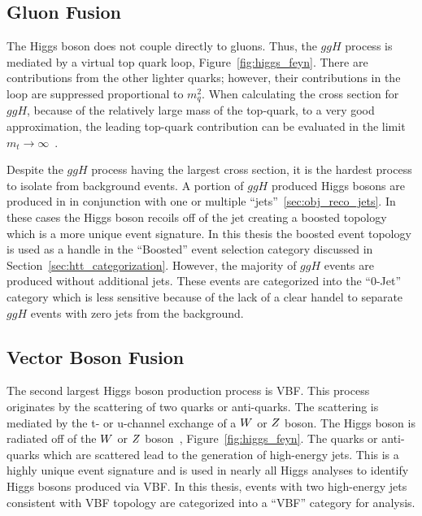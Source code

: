 \subsection{Gluon Fusion}
The Higgs boson does not couple directly to gluons. Thus, the $ggH$ process is mediated by 
a virtual top quark loop, Figure~\ref{fig:higgs_feyn}. There are contributions from the other lighter quarks; however,
their contributions in the loop are suppressed proportional to $m^{2}_{q}$.
When calculating the cross section for $ggH$, because of the relatively large mass of the top-quark, to a very good approximation, 
the leading top-quark contribution can be evaluated in the limit 
$m_{t} \to \infty$~\cite{ELLIS1976292,Shifman:1979eb}.

Despite the $ggH$ process having the largest cross section, it is the hardest process to 
isolate from background events. A portion of $ggH$ produced Higgs bosons are produced in
in conjunction with one or multiple ``jets''~\ref{sec:obj_reco_jets}. In these
cases the Higgs boson recoils off of the jet creating a boosted topology
which is a more unique event signature. In this thesis the boosted event topology
is used as a handle in the ``Boosted'' event selection category discussed in
Section~\ref{sec:htt_categorization}. However, the majority of $ggH$ events are produced without
additional jets. 
These events are categorized into the ``0-Jet'' category which is less sensitive because of the
lack of a clear handel to separate $ggH$ events with zero jets from the background. 


\subsection{Vector Boson Fusion}
The second largest Higgs boson production process is VBF. This process originates by
the scattering of two quarks or anti-quarks. The scattering is mediated by the t-
or u-channel exchange of a $W$ or $Z$ boson. The Higgs boson is radiated off
of the $W$ or $Z$ boson~\cite{PhysRevD.70.113009}, Figure~\ref{fig:higgs_feyn}. 
The quarks or anti-quarks which are scattered
lead to the generation of high-energy jets.
This is a highly unique event signature and is used in nearly all Higgs analyses
to identify Higgs bosons produced via VBF. In this thesis, events with two high-energy
jets consistent with VBF topology are categorized into a ``VBF'' category for analysis.


